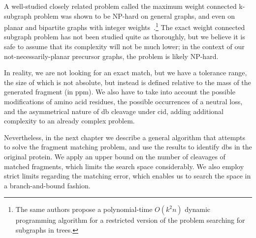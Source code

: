 A well-studied closely related problem called the maximum weight connected k-subgraph problem was shown to be NP-hard on general graphs, and even on planar and bipartite graphs with integer weights~\cite{hochbaum1994node}.\footnote{The same authors propose a polynomial-time \(O(k^2n)\) dynamic programming algorithm for a restricted version of the problem searching for subgraphs in trees.} The exact weight connected subgraph problem has not been studied quite as thoroughly, but we believe it is safe to assume that its complexity will not be much lower; in the context of our not-necessarily-planar precursor graphs, the problem is likely NP-hard.

In reality, we are not looking for an exact match, but we have a tolerance range, the size of which is not absolute, but instead is defined relative to the mass of the generated fragment (in ppm). We also have to take into account the possible modifications of amino acid residues, the possible occurrences of a neutral loss, and the asymmetrical nature of \gls*{db} cleavage under \gls*{cid}, adding additional complexity to an already complex problem.

Nevertheless, in the next chapter we describe a general algorithm that attempts to solve the fragment matching problem, and use the results to identify \glspl*{db} in the original protein. We apply an upper bound on the number of cleavages of matched fragments, which limits the search space considerably. We also employ strict limits regarding the matching error, which enables us to search the space in a branch-and-bound fashion.